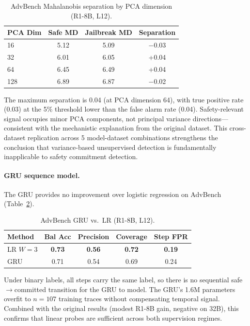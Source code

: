\documentclass[11pt]{article}
\begin{document}
\begin{table}[t]
\centering
\small
\caption{AdvBench Mahalanobis separation by PCA dimension (R1-8B, L12).}
\label{tab:mahalanobis}
\begin{tabular}{lccc}
\toprule
PCA Dim & Safe MD & Jailbreak MD & Separation \\
\midrule
16  & 5.12 & 5.09 & $-$0.03 \\
32  & 6.01 & 6.05 & +0.04 \\
64  & 6.45 & 6.49 & +0.04 \\
128 & 6.89 & 6.87 & $-$0.02 \\
\bottomrule
\end{tabular}
\end{table}

The maximum separation is 0.04 (at PCA dimension 64), with true positive rate (0.03) at the 5\% threshold lower than the false alarm rate (0.04). Safety-relevant signal occupies minor PCA components, not principal variance directions---consistent with the mechanistic explanation from the original dataset. This cross-dataset replication across 5 model-dataset combinations strengthens the conclusion that variance-based unsupervised detection is fundamentally inapplicable to safety commitment detection.

\paragraph{GRU sequence model.} The GRU provides no improvement over logistic regression on AdvBench (Table~\ref{tab:gru}).

\begin{table}[t]
\centering
\small
\caption{AdvBench GRU vs.\ LR (R1-8B, L12).}
\label{tab:gru}
\begin{tabular}{lcccc}
\toprule
Method & Bal Acc & Precision & Coverage & Step FPR \\
\midrule
LR $W{=}3$ & \textbf{0.73} & \textbf{0.56} & \textbf{0.72} & \textbf{0.19} \\
GRU & 0.71 & 0.54 & 0.69 & 0.24 \\
\bottomrule
\end{tabular}
\end{table}

Under binary labels, all steps carry the same label, so there is no sequential safe$\to$committed transition for the GRU to model. The GRU's 1.6M parameters overfit to $n{=}107$ training traces without compensating temporal signal. Combined with the original results (modest R1-8B gain, negative on 32B), this confirms that linear probes are sufficient across both supervision regimes.
\end{document}
